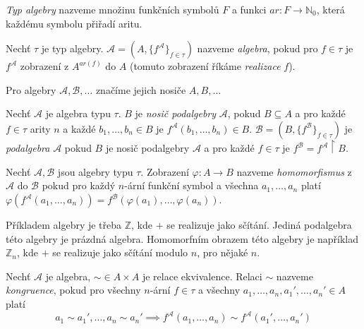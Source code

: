 \begin{definition}
    {\em Typ algebry} nazveme množinu funkčních symbolů $F$ a
    funkci $ar : F \to \mathbb{N}_0$, která každému symbolu přiřadí aritu.
\end{definition}

\begin{definition}[Algebra]
    Nechť $\tau$ je typ algebry.
    $\mathcal{A} = (A, \{ f^\mathcal{A} \}_{f \in \tau})$
    nazveme {\em algebra}, pokud pro $f \in \tau$ je
    $f^\mathcal{A}$ zobrazení z $A^{ar(f)}$ do $A$ (tomuto zobrazení
    říkáme {\em realizace} $f$).
\end{definition}

Pro algebry $\mathcal{A}, \mathcal{B}, \ldots$ značíme jejich nosiče $A,
B, \ldots$

\begin{definition}[Podalgebra]
    Nechť $\mathcal{A}$ je algebra typu $\tau$. $B$ je {\em nosič
    podalgebry} $\mathcal{A}$, pokud $B \subseteq A$ a pro každé
    $f \in \tau$ arity $n$ a každé $b_1,\ldots,b_n \in B$
    je $f^\mathcal{A}(b_1, \ldots, b_n) \in B$.
    $\mathcal{B} = (B, \{ f^\mathcal{B} \}_{f \in \tau})$
    je {\em podalgebra} $\mathcal{A}$ pokud $B$ je nosič
    podalgebry $\mathcal{A}$ a pro každé $f \in \tau$ je
    $f^\mathcal{B} = f^\mathcal{A} \restriction B$.
\end{definition}

\begin{definition}[Homomorfismus]
    Nechť $\mathcal{A}, \mathcal{B}$ jsou algebry typu $\tau$.
    Zobrazení $\varphi : A \to B$ nazveme {\em homomorfismus}
    z $\mathcal{A}$ do $\mathcal{B}$ pokud
    pro každý $n$-ární funkční symbol a všechna $a_1,\ldots,a_n$
    platí $\varphi(f^\mathcal{A}(a_1,\ldots,a_n)) =
    f^\mathcal{B}(\varphi(a_1),\ldots,\varphi(a_n))$.
\end{definition}

\begin{definition}
    Příkladem algebry je třeba $\mathbb{Z}$, kde $+$ se realizuje jako
    sčítání. Jediná podalgebra této algebry je prázdná algebra.
    Homomorfním obrazem této algebry je například $\mathbb{Z}_n$,
    kde $+$ se realizuje jako sčítání modulo $n$, pro
    nějaké $n$.
\end{definition}

\begin{definition}[Kongruence]
    Nechť $\mathcal{A}$ je algebra,
    ${\sim} \in A \times A$ je relace ekvivalence.
    Relaci ${\sim}$ nazveme {\em kongruence},
    pokud pro všechny $n$-ární $f \in \tau$ a všechny
    $a_1, \ldots, a_n, a_1',\ldots,a_n' \in A$
    platí
    \[
    a_1 \sim a_1',\ldots, a_n \sim a_n' \implies
    f^\mathcal{A}(a_1, \ldots, a_n) \sim
    f^\mathcal{A}(a_1', \ldots, a_n')
    \]
\end{definition}

